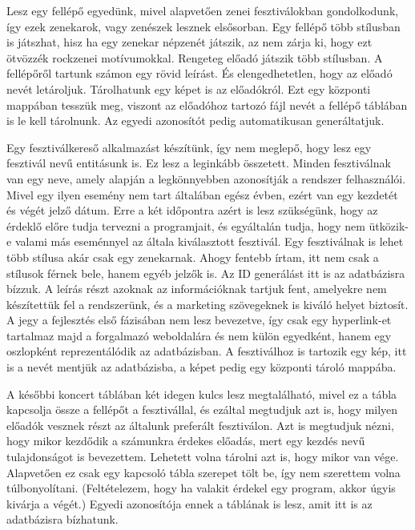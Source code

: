 Lesz egy fellépő egyedünk, mivel alapvetően zenei fesztiválokban gondolkodunk, így ezek zenekarok, vagy zenészek lesznek elsősorban. Egy fellépő több stílusban is játszhat, hisz ha egy zenekar népzenét játszik, az nem zárja ki, hogy ezt ötvözzék rockzenei motívumokkal. Rengeteg előadó játszik több stílusban. A fellépőről tartunk számon egy rövid leírást. És elengedhetetlen, hogy az előadó nevét letároljuk. Tárolhatunk egy képet is az előadókról. Ezt egy központi mappában tesszük meg, viszont az előadóhoz tartozó fájl nevét a fellépő táblában is le kell tárolnunk. Az egyedi azonosítót pedig automatikusan generáltatjuk.

Egy fesztiválkereső alkalmazást készítünk, így nem meglepő, hogy lesz egy fesztivál nevű entitásunk is. Ez lesz a leginkább összetett. Minden fesztiválnak van egy neve, amely alapján a legkönnyebben azonosítják a rendszer felhasználói. Mivel egy ilyen esemény nem tart általában egész évben, ezért van egy kezdetét és végét jelző dátum. Erre a két időpontra azért is lesz szükségünk, hogy az érdeklő előre tudja  tervezni a programjait, és egyáltalán tudja, hogy nem ütközik-e valami más eseménnyel az általa kiválasztott fesztivál. Egy fesztiválnak is lehet több stílusa akár csak egy zenekarnak. Ahogy fentebb írtam, itt nem csak a stílusok férnek bele, hanem egyéb jelzők is. Az ID generálást itt is az adatbázisra bízzuk. A leírás részt azoknak az információknak tartjuk fent, amelyekre nem készítettük fel a rendszerünk, és a marketing szövegeknek is kiváló helyet biztosít. A jegy a fejlesztés első fázisában nem lesz bevezetve, így csak egy hyperlink-et tartalmaz majd a forgalmazó weboldalára és nem külön egyedként, hanem egy oszlopként reprezentálódik az adatbázisban. A fesztiválhoz is tartozik egy kép, itt is a nevét mentjük az adatbázisba, a képet pedig egy központi tároló mappába. 

A későbbi koncert táblában két idegen kulcs lesz megtalálható, mivel ez a tábla kapcsolja össze a fellépőt a fesztivállal, és ezáltal megtudjuk azt is, hogy milyen előadók vesznek részt az általunk preferált fesztiválon. Azt is megtudjuk nézni, hogy mikor kezdődik a számunkra érdekes előadás, mert egy kezdés nevű tulajdonságot is bevezettem. Lehetett volna tárolni azt is, hogy mikor van vége. Alapvetően ez csak egy kapcsoló tábla szerepet tölt be, így nem szerettem volna túlbonyolítani. (Feltételezem, hogy ha valakit érdekel egy program, akkor úgyis kivárja a végét.) Egyedi azonosítója ennek a táblának is lesz, amit itt is az adatbázisra bízhatunk.

